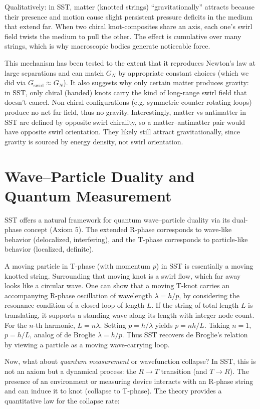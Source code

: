 \documentclass[reprint,aps,onecolumn,nofootinbib]{revtex4-2}
\begin{document}
        Qualitatively: in SST, matter (knotted strings) “gravitationally” attracts because their presence and motion cause slight persistent pressure deficits in the medium that extend far. When two chiral knot-composites share an axis, each one’s swirl field twists the medium to pull the other. The effect is cumulative over many strings, which is why macroscopic bodies generate noticeable force.

        This mechanism has been tested to the extent that it reproduces Newton’s law at large separations and can match $G_N$ by appropriate constant choices (which we did via $G_{\text{swirl}}\approx G_N$). It also suggests why only certain matter produces gravity: in SST, only chiral (handed) knots carry the kind of long-range swirl field that doesn’t cancel. Non-chiral configurations (e.g. symmetric counter-rotating loops) produce no net far field, thus no gravity. Interestingly, matter vs antimatter in SST are defined by opposite swirl chirality, so a matter–antimatter pair would have opposite swirl orientation. They likely still attract gravitationally, since gravity is sourced by energy density, not swirl orientation.


	\section{Wave–Particle Duality and Quantum Measurement}
	SST offers a natural framework for quantum wave–particle duality via its dual-phase concept (Axiom 5). The extended R-phase corresponds to wave-like behavior (delocalized, interfering), and the T-phase corresponds to particle-like behavior (localized, definite).

	A moving particle in T-phase (with momentum $p$) in SST is essentially a moving knotted string. Surrounding that moving knot is a swirl flow, which far away looks like a circular wave. One can show that a moving T-knot carries an accompanying R-phase oscillation of wavelength $\lambda = h/p$, by considering the resonance condition of a closed loop of length $L$. If the string of total length $L$ is translating, it supports a standing wave along its length with integer node count. For the $n$-th harmonic, $L = n \lambda$. Setting $p = h/\lambda$ yields $p = n h/L$. Taking $n=1$, $p = h/L$, analog of de Broglie $\lambda = h/p$. Thus SST recovers de Broglie’s relation by viewing a particle as a moving wave-carrying loop.

	Now, what about \emph{quantum measurement} or wavefunction collapse? In SST, this is not an axiom but a dynamical process: the $R\to T$ transition (and $T\to R$). The presence of an environment or measuring device interacts with an R-phase string and can induce it to knot (collapse to T-phase). The theory provides a quantitative law for the collapse rate:
\end{document}
